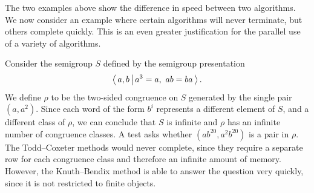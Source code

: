 The two examples above show the difference in speed between two algorithms.  We
now consider an example where certain algorithms will never terminate, but
others complete quickly.  This is an even greater justification for the parallel
use of a variety of algorithms.

\begin{example}
  \label{ex:good-kbfp}
  Consider the semigroup $S$ defined by the semigroup presentation
  $$\left\langle \, a,b \, \middle| \, a^3=a,\ ab=ba \, \right\rangle.$$  We define $\rho$ to be the two-sided congruence on $S$
  generated by the single pair $(a, a^2)$.  Since each word of the form $b^i$
  represents a different element of $S$, and a different class of $\rho$, we can
  conclude that $S$ is infinite and $\rho$ has an infinite number of congruence
  classes.  A test asks whether $(ab^{20}, a^2b^{20})$ is a pair in $\rho$.  The
  Todd--Coxeter methods would never complete, since they require a separate row
  for each congruence class and therefore an infinite amount of memory.
  However, the Knuth--Bendix method is able to answer the question very quickly,
  since it is not restricted to finite objects.
\end{example}




